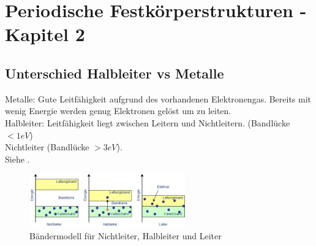 \documentclass{article}
\begin{document}
\section{Periodische Festkörperstrukturen - Kapitel 2}
\subsection{Unterschied Halbleiter vs Metalle }\label{k2:metalle}
Metalle: Gute Leitf\"ahigkeit aufgrund des vorhandenen Elektronengas. Bereits mit wenig Energie werden genug Elektronen gel\"ost um zu leiten.\\
Halbleiter: Leitf\"ahigkeit liegt zwischen Leitern und Nichtleitern. (Bandl\"ucke $< 1eV$)\\
Nichtleiter (Bandl\"ucke $> 3eV$).\\
Siehe .
\begin{figure}[h]
        \centering
        \includegraphics[width=0.6\textwidth]{fig/baendermodellLHL}
        \caption{B\"andermodell f\"ur Nichtleiter, Halbleiter und Leiter}
        \label{fig:bandLHL}
\end{figure}
\end{document}
